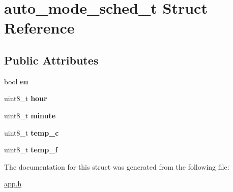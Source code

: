 \hypertarget{structauto__mode__sched__t}{}\section{auto\+\_\+mode\+\_\+sched\+\_\+t Struct Reference}
\label{structauto__mode__sched__t}
\subsection*{Public Attributes}
\begin{DoxyCompactItemize}
\item 
bool {\bfseries en}\hypertarget{structauto__mode__sched__t_aa23b5fae1f7279e4dcd30048939429cb}{}\label{structauto__mode__sched__t_aa23b5fae1f7279e4dcd30048939429cb}

\item 
uint8\+\_\+t {\bfseries hour}\hypertarget{structauto__mode__sched__t_afcc2f2ae967576d17c48e08f2cbcaa02}{}\label{structauto__mode__sched__t_afcc2f2ae967576d17c48e08f2cbcaa02}

\item 
uint8\+\_\+t {\bfseries minute}\hypertarget{structauto__mode__sched__t_a51aa5db21e4f8e23f3f723e26c7d17e5}{}\label{structauto__mode__sched__t_a51aa5db21e4f8e23f3f723e26c7d17e5}

\item 
uint8\+\_\+t {\bfseries temp\+\_\+c}\hypertarget{structauto__mode__sched__t_a89f585649c1617e397c3640dcf1de0ec}{}\label{structauto__mode__sched__t_a89f585649c1617e397c3640dcf1de0ec}

\item 
uint8\+\_\+t {\bfseries temp\+\_\+f}\hypertarget{structauto__mode__sched__t_a6c75569e939997172484af5716aa779c}{}\label{structauto__mode__sched__t_a6c75569e939997172484af5716aa779c}

\end{DoxyCompactItemize}


The documentation for this struct was generated from the following file\+:\begin{DoxyCompactItemize}
\item 
\hyperlink{app_8h}{app.\+h}\end{DoxyCompactItemize}
